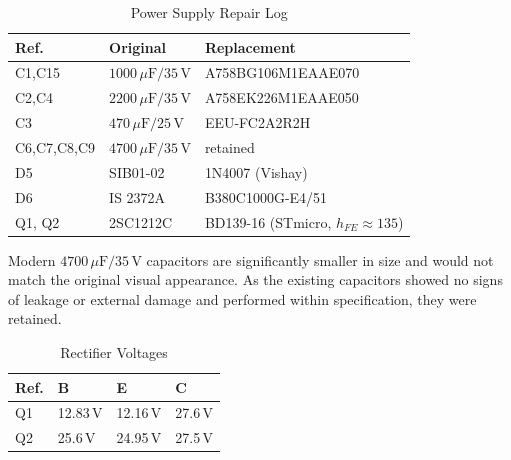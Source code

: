 \documentclass[]{article}
\begin{document}
\begin{table}[H]
	\centering
	\caption{Power Supply Repair Log}
	\label{tab:power_supply_log}
	\begin{tabular}{|l|l|l|}
		\hline
		\textbf{Ref.} & \textbf{Original} & \textbf{Replacement} \\
        \hline
        C1,C15 & $1000\,\mu\mathrm{F} / 35\,\mathrm{V}$ & A758BG106M1EAAE070 \\
        \hline
        C2,C4 & $2200\,\mu\mathrm{F} / 35\,\mathrm{V}$ & A758EK226M1EAAE050 \\
        \hline
        C3 & $470\,\mu\mathrm{F} / 25\,\mathrm{V}$ & EEU-FC2A2R2H \\
        \hline
        C6,C7,C8,C9 & $4700\,\mu\mathrm{F} / 35\,\mathrm{V}$ & retained \\
        \hline
        D5 & SIB01-02 & 1N4007 (Vishay) \\
        \hline
        D6 & IS 2372A & B380C1000G-E4/51 \\
        \hline
        Q1, Q2 & 2SC1212C & BD139-16 (STmicro, $h_{FE} \approx 135$) \\
        \hline
	\end{tabular}
\end{table}

Modern $4700\,\mu\mathrm{F} / 35\,\mathrm{V}$ capacitors are significantly smaller in size and would not match the original visual appearance. As the existing capacitors showed no signs of leakage or external damage and performed within specification, they were retained.

\begin{table}[H]
	\centering
	\caption{Rectifier Voltages}
	\label{tab:rectifier_voltages}
	\begin{tabular}{|l|l|l|l|}
		\hline
		\textbf{Ref.} & \textbf{B} & \textbf{E} & \textbf{C} \\
    \hline
    Q1 & 12.83\,V & 12.16\,V & 27.6\,V \\
    \hline
    Q2 & 25.6\,V & 24.95\,V & 27.5\,V \\
    \hline
	\end{tabular}
\end{table}
\end{document}
